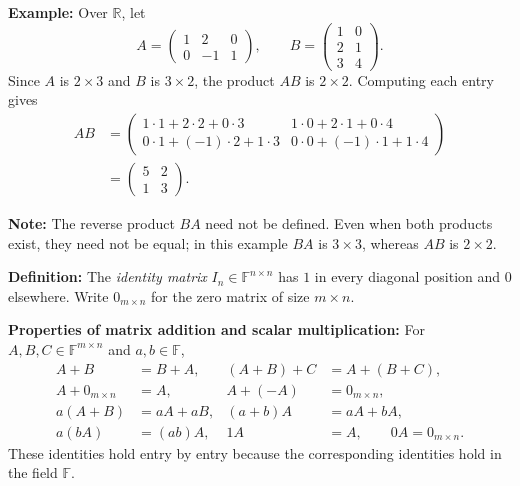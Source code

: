 \documentclass[a4paper,11pt,abstract=true]{scrartcl}
\theoremstyle{dotlessP}
\theoremstyle{dotlessS}
\theoremstyle{remark}
\theoremstyle{definition}
\begin{document}
\begin{example_box}
\textbf{Example:} Over $\mathbb{R}$,
let
\[
A=\begin{pmatrix}1&2&0\\0&-1&1\end{pmatrix},
\qquad B=\begin{pmatrix}1&0\\2&1\\3&4\end{pmatrix}.
\]
Since $A$ is $2\times3$ and $B$ is $3\times2$, the product $AB$ is
$2\times2$. Computing each entry gives
\[
\begin{aligned}
AB
&=\begin{pmatrix}
1\cdot1+2\cdot2+0\cdot3 & 1\cdot0+2\cdot1+0\cdot4\\
0\cdot1+(-1)\cdot2+1\cdot3 & 0\cdot0+(-1)\cdot1+1\cdot4
\end{pmatrix}\\[4pt]
&=\begin{pmatrix}5&2\\1&3\end{pmatrix}.
\end{aligned}
\]
\end{example_box}

\begin{remark_box}
\textbf{Note:} The reverse product $BA$ need not
be defined. Even when both products exist, they need not be equal;
in this example $BA$ is $3\times3$, whereas $AB$ is $2\times2$.
\end{remark_box}

\begin{claim_box}
\textbf{Definition:} The \emph{identity matrix}
$I_n\in\mathbb{F}^{n\times n}$ has $1$ in every diagonal position
and $0$ elsewhere. Write $0_{m\times n}$ for the zero matrix of size
$m\times n$.
\end{claim_box}

\begin{claim_box}
\textbf{Properties of matrix addition and scalar multiplication:}
For $A,B,C\in\mathbb{F}^{m\times n}$ and $a,b\in\mathbb{F}$,
\[
\begin{aligned}
A+B&=B+A, & (A+B)+C&=A+(B+C),\\
A+0_{m\times n}&=A, & A+(-A)&=0_{m\times n},\\
a(A+B)&=aA+aB, & (a+b)A&=aA+bA,\\
a(bA)&=(ab)A, & 1A&=A,\qquad 0A=0_{m\times n}.
\end{aligned}
\]
These identities hold entry by entry because the corresponding
identities hold in the field $\mathbb{F}$.
\end{claim_box}
\end{document}
